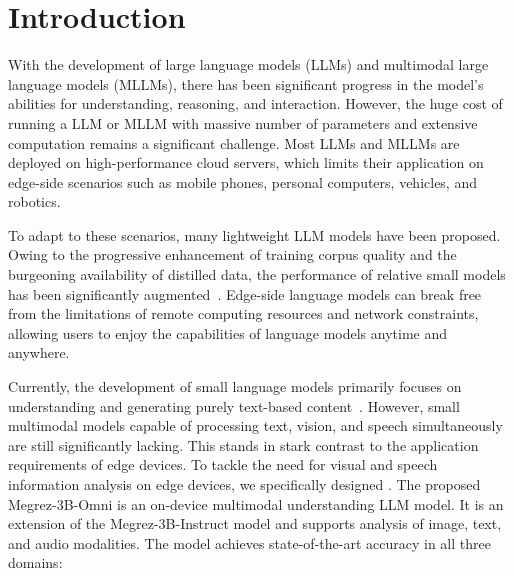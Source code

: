 \section{Introduction}


    With the development of large language models (LLMs) and multimodal large language models (MLLMs), there has been significant progress in the model's abilities for understanding, reasoning, and interaction. However, the huge cost of running a LLM or MLLM with massive number of parameters and extensive computation remains a significant challenge.
    Most LLMs and MLLMs are deployed on high-performance cloud servers, which limits their application on edge-side scenarios such as mobile phones, personal computers, vehicles, and robotics.
    
    To adapt to these scenarios, many lightweight LLM models have been proposed. Owing to the progressive enhancement of training corpus quality and the burgeoning availability of distilled data, the performance of relative small models has been significantly augmented~\cite{hu2024minicpm,abdin2024phi3,yang2024qwen2,yang2024qwen2_5}. Edge-side language models can break free from the limitations of remote computing resources and network constraints, allowing users to enjoy the capabilities of language models anytime and anywhere.

    Currently, the development of small language models primarily focuses on understanding and generating purely text-based content~\cite{mit2025techreview}. However, small multimodal models capable of processing text, vision, and speech simultaneously are still significantly lacking. This stands in stark contrast to the application requirements of edge devices. 
    To tackle the need for visual and speech information analysis on edge devices, we specifically designed \ours. The proposed Megrez-3B-Omni is an on-device multimodal understanding LLM model. It is an extension of the Megrez-3B-Instruct model and supports analysis of image, text, and audio modalities. The model achieves state-of-the-art accuracy in all three domains:
    
